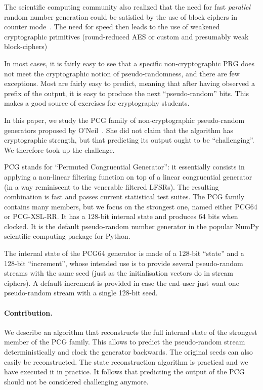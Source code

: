 \documentclass[submission,svgnames,journal=tosc]{iacrtrans}
\begin{document}
The scientific computing community also realized that the need for fast
\emph{parallel} random number generation could be satisfied by the use of block
ciphers in counter mode~\cite{Salmon11}. The need for speed then leads to the
use of weakened cryptographic primitives (round-reduced AES or custom and
presumably weak block-ciphers)

In most cases, it is fairly easy to see that a specific non-cryptographic PRG
does not meet the cryptographic notion of pseudo-randomness, and there are few
exceptions. Most are fairly easy to predict, meaning that after having observed
a prefix of the output, it is easy to produce the next ``pseudo-random''
bits. This makes a good source of exercises for cryptography students.

In this paper, we study the \textsf{PCG} family of non-cryptographic
pseudo-random generators proposed by O'Neil~\cite{melissapaper,melissaweb}. She
did not claim that the algorithm has cryptographic strength, but that predicting
its output ought to be ``challenging''. We therefore took up the challenge.

\textsf{PCG} stands for ``Permuted Congruential Generator'': it essentially
consists in applying a non-linear filtering function on top of a linear
congruential generator (in a way reminiscent to the venerable filtered
LFSRs). The resulting combination is fast and passes current statistical test
suites. The \textsf{PCG} family contains many members, but we focus on the
strongest one, named either \textsf{PCG64} or \textsf{PCG-XSL-RR}. It has a
128-bit internal state and produces 64 bits when clocked. It is the default
pseudo-random number generator in the popular \textsf{NumPy} scientific
computing package for \textsf{Python}.

The internal state of the \textsf{PCG64} generator is made of a 128-bit
``state'' and a 128-bit ``increment'', whose intended use is to provide several
pseudo-random streams with the same seed (just as the initialisation vectors do
in stream ciphers). A default increment is provided in case the end-user just
want one pseudo-random stream with a single 128-bit seed.

\paragraph{Contribution.} We describe an algorithm that reconstructs the full
internal state of the strongest member of the \textsf{PCG} family. This allows
to predict the pseudo-random stream deterministically and clock the generator
backwards. The original seeds can also easily be reconstructed. The state
reconstruction algorithm is practical and we have executed it in practice. It
follows that predicting the output of the \textsf{PCG} should not be considered
challenging anymore.
\end{document}
